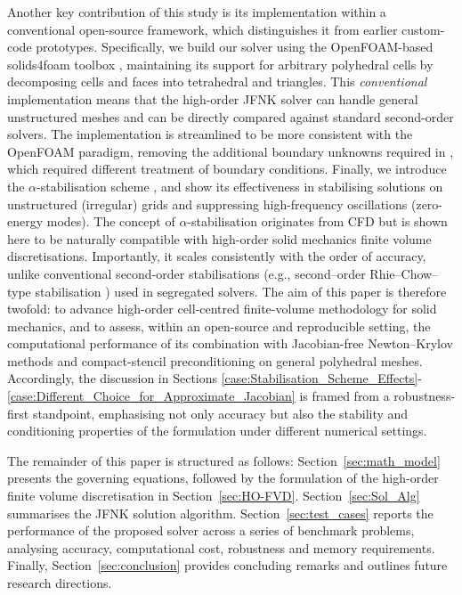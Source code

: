 \documentclass[review,3p]{elsarticle}
\begin{document}
Another key contribution of this study is its implementation within a conventional open-source framework, which distinguishes it from earlier custom-code prototypes.
Specifically, we build our solver using the OpenFOAM-based solids4foam toolbox \cite{Weller1998, Cardiff2025a}, maintaining its support for arbitrary polyhedral cells by decomposing cells and faces into tetrahedral and triangles.
This \emph{conventional} implementation means that the high-order JFNK solver can handle general unstructured meshes and can be directly compared against standard second-order solvers.
The implementation is streamlined to be more consistent with the OpenFOAM paradigm, removing the additional boundary unknowns required in \cite{Castrillo2022, Castrillo2024}, which required different treatment of boundary conditions. Finally, we introduce the $\alpha$-stabilisation scheme \cite{Antoniadis2022, Nishikawa2010, Nishikawa2011, Nishikawa2025a}, and show its effectiveness in stabilising solutions on unstructured (irregular) grids and suppressing high-frequency oscillations (zero-energy modes). The concept of $\alpha$-stabilisation originates from CFD but is shown here to be naturally compatible with high-order solid mechanics finite volume discretisations. Importantly, it scales consistently with the order of accuracy, unlike conventional second-order stabilisations (e.g., second–order Rhie–Chow–type stabilisation \cite{Cardiff2025a}) used in segregated solvers. {\color{orange}The aim of this paper is therefore twofold: to advance high-order cell-centred finite-volume methodology for solid mechanics, and to assess, within an open-source and reproducible setting, the computational performance of its combination with Jacobian-free Newton--Krylov methods and compact-stencil preconditioning on general polyhedral meshes.}
%
%
{\color{orange}Accordingly, the discussion in Sections \ref{case:Stabilisation_Scheme_Effects}-\ref{case:Different_Choice_for_Approximate_Jacobian} is framed from a robustness-first standpoint, emphasising not only accuracy but also the stability and conditioning properties of the formulation under different numerical settings.}

The remainder of this paper is structured as follows: Section~\ref{sec:math_model} presents the governing equations, followed by the formulation of the high-order finite volume discretisation in Section~\ref{sec:HO-FVD}. Section~\ref{sec:Sol_Alg} summarises the JFNK solution algorithm. Section~\ref{sec:test_cases} reports the performance of the proposed solver across a series of benchmark problems, analysing accuracy, computational cost, robustness and memory requirements. Finally, Section~\ref{sec:conclusion} provides concluding remarks and outlines future research directions.
%
%
\end{document}
